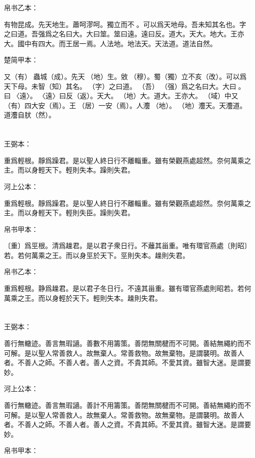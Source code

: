 \documentclass[a5paper]{ctexbook}
\begin{document}
    帛书乙本：

    有物昆成。先天地生。蕭呵漻呵。獨立而不󱁡。可以爲天地母。吾未知其名也。字之曰道。吾强爲之名曰大。大曰筮。筮曰遠。遠曰反。道大。天大。地大。王亦大。國中有四大。而王居一焉。人法地。地法天。天法道。道法自然。

    楚简甲本：

    又（有）󶴷蟲城（成）。先天󶴵（地）生。敓󶴸（穆）。蜀（獨）立不亥（改）。可以爲天下母。未智（知）其名。󼼐（字）之曰道。󼾲（吾）󶴔（强）爲之名曰大。大曰󶴹。󶴹曰󶴿〈遠〉。󶴿〈遠〉曰反（返）。天大。󶴵（地）大。道大。王亦大。󶴺（域）中又（有）四大安（焉）。王󶵀（居）一安（焉）。人灋󶴵（地）。󶴵（地）灋天。天灋道。道灋自肰（然）。

    \chapter{}
    王弼本：

    重爲輕根。靜爲躁君。是以聖人終日行不離輜重。雖有榮觀燕處超然。奈何萬乘之主。而以身輕天下。輕則失本。躁則失君。

    河上公本：

    重爲輕根。靜爲躁君。是以聖人終日行不離輜重。雖有榮觀燕處超然。奈何萬乘之主。而以身輕天下。輕則失臣。躁則失君。

    帛书甲本：

    〔重〕爲巠根。清爲趮君。是以君子衆日行。不蘺其甾重。唯有環官燕處〔則昭〕若。若何萬乘之王。而以身巠於天下。巠則失本。趮則失君。

    帛书乙本：

    重爲輕根。静爲趮君。是以君子冬日行。不遠其甾重。雖有環官燕處則昭若。若何萬乘之王。而以身輕於天下。輕則失本。趮則失君。

    \chapter{}
    王弼本：

    善行無轍迹。善言無瑕讁。善數不用籌策。善閉無關楗而不可開。善結無繩約而不可解。是以聖人常善救人。故無棄人。常善救物。故無棄物。是謂襲明。故善人者。不善人之師。不善人者。善人之資。不貴其師。不愛其資。雖智大迷。是謂要妙。

    河上公本：

    善行無轍迹。善言無瑕讁。善計不用籌策。善閉無關楗而不可開。善結無繩約而不可解。是以聖人常善救人。故無棄人。常善救物。故無棄物。是謂襲明。故善人者。不善人之師。不善人者。善人之資。不貴其師。不愛其資。雖智大迷。是謂要妙。

    帛书甲本：
\end{document}
